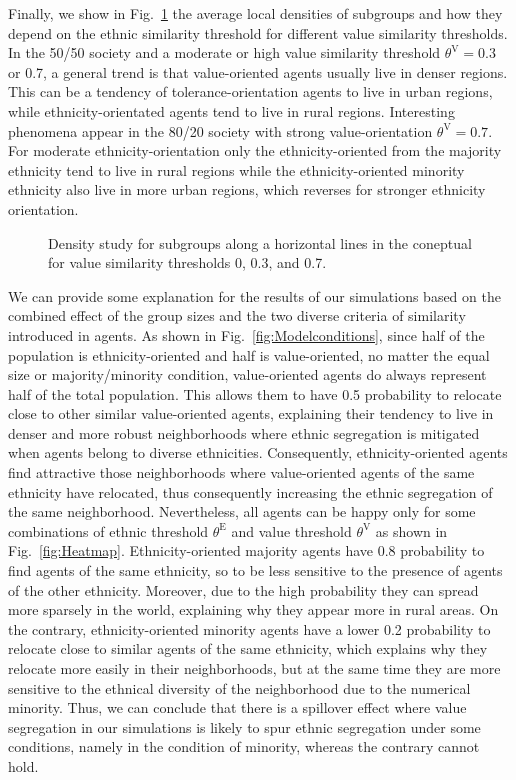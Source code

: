 \documentclass{ws-acs}
\begin{document}
{Finally, we show in Fig.~\ref{fig:Densities} the average local densities of subgroups and how they depend on the ethnic similarity threshold for different value similarity thresholds. In the 50/50 society and a moderate or high value similarity threshold $\theta^\text{V}=0.3$ or 0.7, a general trend is that value-oriented agents usually live in denser regions. This can be a tendency of tolerance-orientation agents to live in urban regions, while ethnicity-orientated agents tend to live in rural regions. Interesting phenomena appear in the 80/20 society with strong value-orientation $\theta^\text{V}=0.7$. For moderate ethnicity-orientation only the ethnicity-oriented from the majority ethnicity tend to live in rural regions while the ethnicity-oriented minority ethnicity also live in more urban regions, which reverses for stronger ethnicity orientation. 

\begin{figure}[th]
\centerline{}
\vspace*{8pt}
\caption{Density study for subgroups along a horizontal lines in the coneptual for value similarity thresholds 0, 0.3, and 0.7.}
\label{fig:Densities}
\end{figure}

We can provide some explanation for the results of our simulations based on the combined effect of the group sizes and the two diverse criteria of similarity introduced in agents. As shown in Fig.~\ref{fig:Modelconditions}, since half of the population is ethnicity-oriented and half is value-oriented, no matter the equal size or majority/minority condition, value-oriented agents do always represent half of the total population. This allows them to have 0.5 probability to relocate close to other similar value-oriented agents, explaining their tendency to live in denser and more robust neighborhoods where ethnic segregation is mitigated when agents belong to diverse ethnicities. Consequently, ethnicity-oriented agents find attractive those neighborhoods where value-oriented agents of the same ethnicity have relocated, thus consequently increasing the ethnic segregation of the same neighborhood. Nevertheless, all agents can be happy only for some combinations of ethnic threshold $\theta^\text{E}$ and value threshold $\theta^\text{V}$ as shown in Fig.~\ref{fig:Heatmap}. Ethnicity-oriented majority agents have 0.8 probability to find agents of the same ethnicity, so to be less sensitive to the presence of agents of the other ethnicity. Moreover, due to the high probability they can spread more sparsely in the world, explaining why they appear more in rural areas. On the contrary, ethnicity-oriented minority agents have a lower 0.2 probability to relocate close to similar agents of the same ethnicity, which explains why they relocate more easily in their neighborhoods, but at the same time they are more sensitive to the ethnical diversity of the neighborhood due to the numerical minority. Thus, we can conclude that there is a spillover effect where value segregation in our simulations is likely to spur ethnic segregation under some conditions, namely in the condition of minority, whereas the contrary cannot hold.

}
\end{document}
